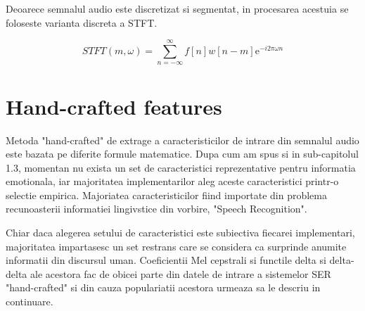 \documentclass[a4paper,12pt]{book}
\begin{document}
			Deoarece semnalul audio este discretizat si segmentat, in procesarea acestuia se foloseste varianta discreta a STFT.
			
			\begin{equation}
			STFT(m ,\omega) = \sum_{n=-\infty}^{\infty}  f[n] w[n-m]\mathrm{e}^{- i 2\pi \omega n}  \label{stft}
			\end{equation}
			
			
			\section{Hand-crafted features} \label{hand-crafted}
			
			Metoda "hand-crafted" de extrage a caracteristicilor de intrare din semnalul audio este bazata pe diferite formule matematice. Dupa cum am spus si in sub-capitolul 1.3, momentan nu exista un set de caracteristici reprezentative pentru informatia emotionala, iar majoritatea implementarilor aleg aceste caracteristici printr-o selectie empirica. Majoriatea caracteristicilor fiind importate din problema recunoasterii informatiei lingivstice din vorbire, "Speech Recognition". \par
			
			Chiar daca alegerea setului de caracteristici este subiectiva fiecarei implementari, majoritatea impartasesc un set restrans care se considera ca surprinde anumite informatii din discursul uman. Coeficientii Mel cepstrali si functile delta si delta-delta ale acestora fac de obicei parte din datele de intrare a sistemelor SER "hand-crafted" si din cauza populariatii acestora urmeaza sa le descriu in continuare. \par
			
\end{document}
